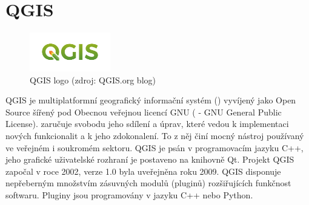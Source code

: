 \section{QGIS}

\begin{figure}[H]
    \centering
      \includegraphics[width=100pt]{./pictures/qgis.png}
      \caption[QGIS logo]{QGIS logo (zdroj: QGIS.org blog)}
      \label{fig:qgis}
\end{figure}
 
QGIS je multiplatformní geografický informační systém () vyvíjený jako Open Source šířený pod Obecnou veřejnou licencí GNU ( - GNU General Public License).  zaručuje svobodu jeho sdílení a úprav, které vedou k implementaci nových funkcionalit a k jeho zdokonalení. To z něj činí mocný nástroj používaný ve veřejném i soukromém sektoru. QGIS je psán v programovacím jazyku C++, jeho grafické uživatelské rozhraní je postaveno na knihovně Qt. Projekt QGIS započal v roce 2002, verze 1.0 byla uveřejněna roku 2009. QGIS disponuje nepřeberným množstvím zásuvných modulů (pluginů) rozšiřujících funkčnost softwaru. Pluginy jsou programovány v jazyku C++ nebo Python. \cite{masteringQgis}




   